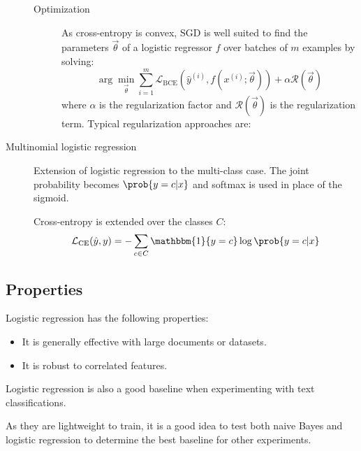 \begin{description}
\begin{description}
            \item[Optimization]
                As cross-entropy is convex, SGD is well suited to find the parameters $\vec{\theta}$ of a logistic regressor $f$ over batches of $m$ examples by solving:
                \[ \arg\min_{\vec{\theta}} \sum_{i=1}^{m} \mathcal{L}_\text{BCE}(\hat{y}^{(i)}, f(x^{(i)}; \vec{\theta})) + \alpha \mathcal{R}(\vec{\theta}) \]
                where $\alpha$ is the regularization factor and $\mathcal{R}(\vec{\theta})$ is the regularization term. Typical regularization approaches are:
        \end{description}

    \item[Multinomial logistic regression] 
        Extension of logistic regression to the multi-class case. The joint probability becomes $\prob{y = c | x}$ and softmax is used in place of the sigmoid.

        Cross-entropy is extended over the classes $C$:
        \[ \mathcal{L}_\text{CE}(\hat{y}, y) = - \sum_{c \in C} \mathbbm{1}\{y = c\} \log \prob{y = c | x} \]
\end{description}


\subsection{Properties}

Logistic regression has the following properties:
\begin{itemize}
    \item It is generally effective with large documents or datasets.
    \item It is robust to correlated features.
\end{itemize}

\begin{remark}
    Logistic regression is also a good baseline when experimenting with text classifications.

    As they are lightweight to train, it is a good idea to test both naive Bayes and logistic regression to determine the best baseline for other experiments.
\end{remark}



